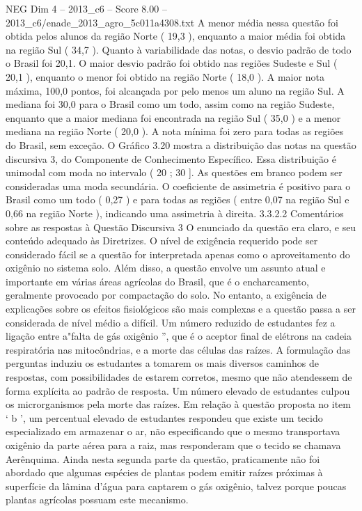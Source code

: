 \begin{textsample}{NEG Dim 4 – 2013\_c6 – Score 8.00 – 2013\_c6/enade\_2013\_agro\_5c011a4308.txt}
A menor média nessa questão foi obtida pelos alunos da região Norte ( 19,3 ), enquanto a maior média foi obtida na região Sul ( 34,7 ).
Quanto à variabilidade das notas, o desvio padrão de todo o Brasil foi 20,1.
O maior desvio padrão foi obtido nas regiões Sudeste e Sul ( 20,1 ), enquanto o menor foi obtido na região Norte ( 18,0 ).
A maior nota máxima, 100,0 pontos, foi alcançada por pelo menos um aluno na região Sul.
A mediana foi 30,0 para o Brasil como um todo, assim como na região Sudeste, enquanto que a maior mediana foi encontrada na região Sul ( 35,0 ) e a menor mediana na região Norte ( 20,0 ).
A nota mínima foi zero para todas as regiões do Brasil, sem exceção.
O Gráfico 3.20 mostra a distribuição das notas na questão discursiva 3, do Componente de Conhecimento Específico.
Essa distribuição é unimodal com moda no intervalo ( 20 ; 30 ].
As questões em branco podem ser consideradas uma moda secundária.
O coeficiente de assimetria é positivo para o Brasil como um todo ( 0,27 ) e para todas as regiões ( entre 0,07 na região Sul e 0,66 na região Norte ), indicando uma assimetria à direita. 3.3.2.2 Comentários sobre as respostas à Questão Discursiva 3 O enunciado da questão era claro, e seu conteúdo adequado às Diretrizes.
O nível de exigência requerido pode ser considerado fácil se a questão for interpretada apenas como o aproveitamento do oxigênio no sistema solo.
Além disso, a questão envolve um assunto atual e importante em várias áreas agrícolas do Brasil, que é o encharcamento, geralmente provocado por compactação do solo.
No entanto, a exigência de explicações sobre os efeitos fisiológicos são mais complexas e a questão passa a ser considerada de nível médio a difícil.
Um número reduzido de estudantes fez a ligação entre a"falta de gás oxigênio ”, que é o aceptor final de elétrons na cadeia respiratória nas mitocôndrias, e a morte das células das raízes.
A formulação das perguntas induziu os estudantes a tomarem os mais diversos caminhos de respostas, com possibilidades de estarem corretos, mesmo que não atendessem de forma explícita ao padrão de resposta.
Um número elevado de estudantes culpou os microrganismos pela morte das raízes.
Em relação à questão proposta no item ‘ b ’, um percentual elevado de estudantes respondeu que existe um tecido especializado em armazenar o ar, não especificando que o mesmo transportava oxigênio da parte aérea para a raiz, mas responderam que o tecido se chamava Aerênquima.
Ainda nesta segunda parte da questão, praticamente não foi abordado que algumas espécies de plantas podem emitir raízes próximas à superfície da lâmina d'água para captarem o gás oxigênio, talvez porque poucas plantas agrícolas possuam este mecanismo.

\end{textsample}
